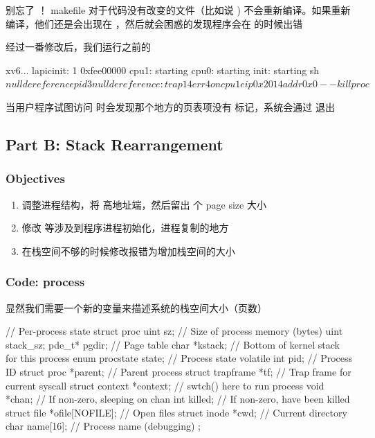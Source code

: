 别忘了  ！ makefile 对于代码没有改变的文件（比如说 ) 不会重新编译。如果重新编译，他们还是会出现在 ，然后就会困惑的发现程序会在  的时候出错 

经过一番修改后，我们运行之前的 

\begin{textcode}
    xv6...
    lapicinit: 1 0xfee00000
    cpu1: starting
    cpu0: starting
    init: starting sh
    $ nulldereference
    pid 3 nulldereference: trap 14 err 4 on cpu 1 eip 0x2014 addr 0x0--kill proc
    $ 
\end{textcode}

当用户程序试图访问  时会发现那个地方的页表项没有  标记，系统会通过  退出

\subsection{Part B: Stack Rearrangement}

\subsubsection{Objectives}

\begin{enumerate}
    \item 调整进程结构，将 高地址端，然后留出  个 page size 大小
    \item 修改  等涉及到程序进程初始化，进程复制的地方
    \item 在栈空间不够的时候修改报错为增加栈空间的大小
\end{enumerate}


\subsubsection{Code: process}

显然我们需要一个新的变量来描述系统的栈空间大小（页数）


\begin{ccode}
    // Per-process state
    struct proc {
        uint sz;                     // Size of process memory (bytes)
        uint stack_sz;
        pde_t* pgdir;                // Page table
        char *kstack;                // Bottom of kernel stack for this process
        enum procstate state;        // Process state
        volatile int pid;            // Process ID
        struct proc *parent;         // Parent process
        struct trapframe *tf;        // Trap frame for current syscall
        struct context *context;     // swtch() here to run process
        void *chan;                  // If non-zero, sleeping on chan
        int killed;                  // If non-zero, have been killed
        struct file *ofile[NOFILE];  // Open files
        struct inode *cwd;           // Current directory
        char name[16];               // Process name (debugging)
    };
\end{ccode}

